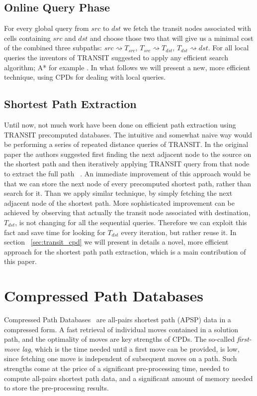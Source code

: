 \documentclass[runningheads,a4paper]{llncs}
\begin{document}
\subsection{Online Query Phase}\label{sub:query}
For every global query from $src$ to $dst$ we fetch the transit nodes associated with cells containing
$src$ and $dst$ and choose those two that will give us a minimal cost of the combined three subpaths:
$src \rightsquigarrow T_{src}$, $T_{src} \rightsquigarrow T_{dst}$, $T_{dst} \rightsquigarrow dst$.
For all local queries the inventors of TRANSIT suggested to apply any efficient search algorithm; A* for example \cite{bast06}.
In what follows we will present a new, more efficient technique, using CPDs for dealing with local queries.

\subsection{Shortest Path Extraction}\label{sub:path_extraction}
Until now, not much work have been done on efficient path extraction using TRANSIT precomputed databases.
The intuitive and somewhat naive way would be performing a series of repeated distance queries of TRANSIT.
In the original paper the authors suggested first finding the next adjacent node to the source on the shortest path
and then iteratively applying TRANSIT query from that node to extract the full path ~\cite{bast06}.
An immediate improvement of this approach would be that we can store the next node of every precomputed
shortest path, rather than search for it.  Than we apply similar technique, by simply fetching the next adjacent node of the shortest path.
More sophisticated improvement can be achieved by observing that actually the transit node associated with destination, $T_{dst}$,
is not changing for all the sequential queries. Therefore we can exploit this fact and save time for looking for $T_{dst}$ every iteration, but 
rather reuse it.
In section ~\ref{sec:transit_cpd} we will present in details a novel, more efficient approach for the shortest path path extraction,
which is a main contribution of this paper.

\section{Compressed Path Databases}

Compressed Path Databases~\cite{botea11,DBLP:conf/socs/Botea12} are
all-pairs shortest path (APSP) data in a compressed form.
A fast retrieval of individual moves contained in a solution path, and the
optimality of moves are key strengths of CPDs. The so-called \emph{first-move
lag}, which is the time needed until a first move can be provided, is low,
since fetching one move is independent of subsequent moves on a path. 
Such strengths come at the price of a
significant pre-processing time, needed to compute all-pairs shortest path data,
and a significant amount of memory needed to store the pre-processing results.
\end{document}
